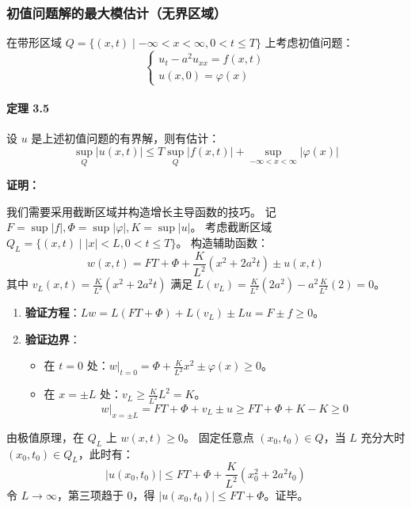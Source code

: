 \documentclass[12pt,a4paper]{ctexart}
\begin{document}
	\subsubsection{初值问题解的最大模估计（无界区域）}
	
	在带形区域 $Q = \{(x,t) \mid -\infty < x < \infty, 0 < t \leqslant T\}$ 上考虑初值问题：
	\begin{equation}
		\begin{cases}
			u_t - a^2 u_{xx} = f(x,t) \\
			u(x,0) = \varphi(x)
		\end{cases}
	\end{equation}
	
	\paragraph{定理 3.5}
	设 $u$ 是上述初值问题的有界解，则有估计：
	\begin{equation}
		\sup_Q |u(x,t)| \leqslant T \sup_Q |f(x,t)| + \sup_{-\infty < x < \infty} |\varphi(x)|
	\end{equation}
	
	\textbf{证明：}
	
	我们需要采用截断区域并构造增长主导函数的技巧。
	记 $F = \sup |f|, \Phi = \sup |\varphi|, K = \sup |u|$。
	考虑截断区域 $Q_L = \{(x,t) \mid |x| < L, 0 < t \leqslant T\}$。
	构造辅助函数：
	\[
	w(x,t) = FT + \Phi + \frac{K}{L^2}(x^2 + 2a^2t) \pm u(x,t)
	\]
	其中 $v_L(x,t) = \frac{K}{L^2}(x^2 + 2a^2t)$ 满足 $L(v_L) = \frac{K}{L^2}(2a^2) - a^2 \frac{K}{L^2}(2) = 0$。
	\begin{enumerate}
		\item \textbf{验证方程}：$Lw = L(FT+\Phi) + L(v_L) \pm Lu = F \pm f \geqslant 0$。
		\item \textbf{验证边界}：
		\begin{itemize}
			\item 在 $t=0$ 处：$w|_{t=0} = \Phi + \frac{K}{L^2}x^2 \pm \varphi(x) \geqslant 0$。
			\item 在 $x=\pm L$ 处：$v_L \geqslant \frac{K}{L^2}L^2 = K$。
			\[
			w|_{x=\pm L} = FT + \Phi + v_L \pm u \geqslant FT + \Phi + K - K \geqslant 0
			\]
		\end{itemize}
	\end{enumerate}
	由极值原理，在 $Q_L$ 上 $w(x,t) \geqslant 0$。
	固定任意点 $(x_0, t_0) \in Q$，当 $L$ 充分大时 $(x_0, t_0) \in Q_L$，此时有：
	\[
	|u(x_0, t_0)| \leqslant FT + \Phi + \frac{K}{L^2}(x_0^2 + 2a^2 t_0)
	\]
	令 $L \to \infty$，第三项趋于 0，得 $|u(x_0, t_0)| \leqslant FT + \Phi$。证毕。
	
\end{document}
